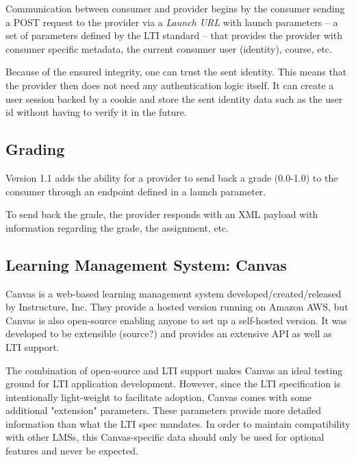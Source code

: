 Communication between consumer and provider begins by the consumer sending a POST request to the provider via a \textit{Launch URL} with launch parameters -- a set of parameters defined by the LTI standard -- that provides the provider with consumer specific metadata, the current consumer user (identity), course, etc.

Because of the ensured integrity, one can trust the sent identity. This means that the provider then does not need any authentication logic itself. It can create a user session backed by a cookie and store the sent identity data such as the user id without having to verify it in the future. %

\subsection{Grading}

Version 1.1 adds the ability for a provider to send back a grade (0.0-1.0) to the consumer through an endpoint defined in a launch parameter.

To send back the grade, the provider responds with an XML payload with information regarding the grade, the assignment, etc. %


\subsection{Learning Management System: Canvas}


Canvas is a web-based learning management system developed/created/released by Instructure, Inc. They provide a hosted version running on Amazon AWS, but Canvas is also open-source enabling anyone to set up a self-hosted version. It was developed to be extensible (source?) and provides an extensive API as well as LTI support.

The combination of open-source and LTI support makes Canvas an ideal testing ground for LTI application development. However, since the LTI specification is intentionally light-weight to facilitate adoption, Canvas comes with some additional "extension" parameters. These parameters provide more detailed information than what the LTI spec mandates. In order to maintain compatibility with other LMSs, this Canvas-specific data should only be used for optional features and never be expected.  

